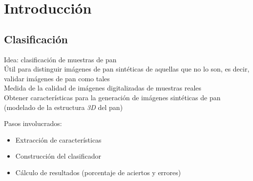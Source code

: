 \documentclass{beamer}
\begin{document}

\section{Introducci\'on}

\subsection{Clasificaci\'on}

\begin{frame}
\begin{center}
{\huge Idea: clasificaci\'on de muestras de pan }\\
\vspace{10px}
{\large \'Util para distinguir im\'agenes de pan sint\'eticas de aquellas que no lo son, es decir, validar im\'agenes de pan como tales}\\
\vspace{10px}
{\large Medida de la calidad de im\'agenes digitalizadas de muestras reales}\\
\vspace{10px}
{\large Obtener caracter\'isticas para la generaci\'on de im\'agenes sint\'eticas de pan (modelado de la estructura {\em 3D} del pan)}\\
\end{center}
\end{frame}

\begin{frame}
\begin{center}
{\huge Pasos involucrados: }\\
\begin{itemize}
\item Extracci\'on de caracter\'isticas
\item Construcci\'on del clasificador
\item C\'alculo de resultados (porcentaje de aciertos y errores)
\end{itemize}
\end{center}
\end{frame}
\end{document}
